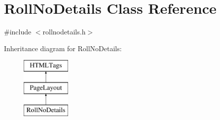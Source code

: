 \hypertarget{classRollNoDetails}{\section{Roll\-No\-Details Class Reference}
\label{classRollNoDetails}
}


{\ttfamily \#include $<$rollnodetails.\-h$>$}

Inheritance diagram for Roll\-No\-Details\-:\begin{figure}[H]
\begin{center}
\leavevmode
\includegraphics[height=3.000000cm]{classRollNoDetails}
\end{center}
\end{figure}
